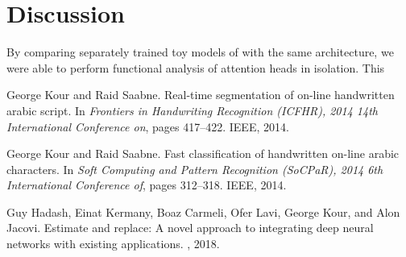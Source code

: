 \documentclass{article}
\begin{document}
\section{Discussion}

By comparing separately trained toy models of with the same architecture, we were able to perform functional analysis of attention heads in isolation. This 

  


\begin{thebibliography}{1}

George Kour and Raid Saabne.
\newblock Real-time segmentation of on-line handwritten arabic script.
\newblock In {\em Frontiers in Handwriting Recognition (ICFHR), 2014 14th
  International Conference on}, pages 417--422. IEEE, 2014.

George Kour and Raid Saabne.
\newblock Fast classification of handwritten on-line arabic characters.
\newblock In {\em Soft Computing and Pattern Recognition (SoCPaR), 2014 6th
  International Conference of}, pages 312--318. IEEE, 2014.

Guy Hadash, Einat Kermany, Boaz Carmeli, Ofer Lavi, George Kour, and Alon
  Jacovi.
\newblock Estimate and replace: A novel approach to integrating deep neural
  networks with existing applications.
, 2018.

\end{thebibliography}
\end{document}
